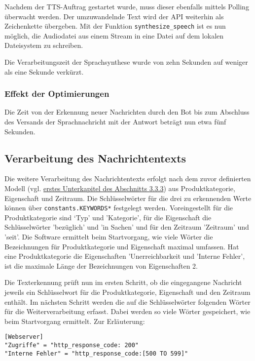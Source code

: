 Nachdem der TTS-Auftrag gestartet wurde, muss dieser ebenfalls mittels Polling überwacht werden. Der umzuwandelnde Text wird der API weiterhin als Zeichenkette übergeben. Mit der Funktion \lstinline{synthesize_speech} ist es nun möglich, die Audiodatei aus einem Stream in eine Datei auf dem lokalen Dateisystem zu schreiben. 

Die Verarbeitungszeit der Sprachsynthese wurde von zehn Sekunden auf weniger als eine Sekunde verkürzt.

\subsubsection{Effekt der Optimierungen}

Die Zeit von der Erkennung neuer Nachrichten durch den Bot bis zum Abschluss des Versands der Sprachnachricht mit der Antwort beträgt nun etwa fünf Sekunden.

\subsection{Verarbeitung des Nachrichtentexts}

Die weitere Verarbeitung des Nachrichtentexts erfolgt nach dem zuvor definierten Modell (vgl. \hyperref[sec:syntax]{erstes Unterkapitel des Abschnitts 3.3.3}) aus Produktkategorie, Eigenschaft und Zeitraum. Die Schlüsselwörter für die drei zu erkennenden Werte können über \lstinline{constants.KEYWORDS*} festgelegt werden. Voreingestellt für die Produktkategorie sind ‘Typ' und 'Kategorie', für die Eigenschaft die Schlüsselwörter 'bezüglich' und 'in Sachen' und für den Zeitraum 'Zeitraum' und 'seit'. Die Software ermittelt beim Startvorgang, wie viele Wörter die Bezeichnungen für Produktkategorie und Eigenschaft maximal umfassen. Hat eine Produktkategorie die Eigenschaften 'Unerreichbarkeit und 'Interne Fehler', ist die maximale Länge der Bezeichnungen von Eigenschaften 2. 

Die Texterkennung prüft nun im ersten Schritt, ob die eingegangene Nachricht jeweils ein Schlüsselwort für die Produktkategorie, Eigenschaft und den Zeitraum enthält. Im nächsten Schritt werden die auf die Schlüsselwörter folgenden Wörter für die Weiterverarbeitung erfasst. Dabei werden so viele Wörter gespeichert, wie beim Startvorgang ermittelt. Zur Erläuterung:

\begin{lstlisting}[caption={Beispiel für eine mögliche Konfiguration in der Datei config.toml}, label=config-toml, xleftmargin=6mm]
[Webserver]
"Zugriffe" = "http_response_code: 200"
"Interne Fehler" = "http_response_code:[500 TO 599]"
\end{lstlisting}

